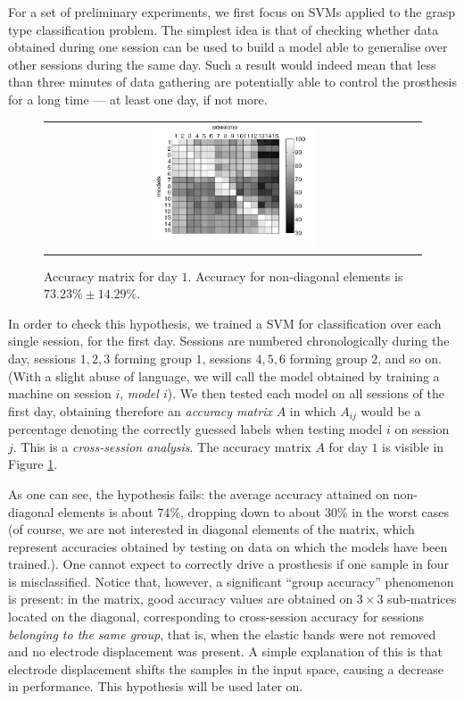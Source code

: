 For a set of preliminary experiments, we first focus on SVMs applied
to the grasp type classification problem. The simplest idea is that of
checking whether data obtained during one session can be used to build
a model able to generalise over other sessions during the same
day. Such a result would indeed mean that less than three minutes of
data gathering are potentially able to control the prosthesis for a
long time --- at least one day, if not more.

\begin{figure}[!ht] \centering
  \begin{tabular}{c}
    \includegraphics[width=0.45\textwidth]{figs/fig_resCross1_full.png}
  \end{tabular}
  \caption{Accuracy matrix for day $1$. Accuracy for non-diagonal
    elements is $73.23\% \pm 14.29\%$.}
  \label{fig:cross_first}
\end{figure}

In order to check this hypothesis, we trained a SVM for classification
over each single session, for the first day. Sessions are numbered
chronologically during the day, sessions $1,2,3$ forming group $1$,
sessions $4,5,6$ forming group $2$, and so on. (With a slight abuse of
language, we will call the model obtained by training a machine on
session $i$, \emph{model $i$}). We then tested each model on all
sessions of the first day, obtaining therefore an \emph{accuracy
matrix} $A$ in which $A_{ij}$ would be a percentage denoting the
correctly guessed labels when testing model $i$ on session $j$. This
is a \emph{cross-session analysis}. The accuracy matrix $A$ for day
$1$ is visible in Figure \ref{fig:cross_first}.

As one can see, the hypothesis fails: the average accuracy attained on
non-diagonal elements is about $74\%$, dropping down to about $30\%$
in the worst cases (of course, we are not interested in diagonal
elements of the matrix, which represent accuracies obtained by testing
on data on which the models have been trained.). One cannot expect to
correctly drive a prosthesis if one sample in four is
misclassified. Notice that, however, a significant ``group accuracy''
phenomenon is present: in the matrix, good accuracy values are
obtained on $3\times3$ sub-matrices located on the diagonal,
corresponding to cross-session accuracy for sessions \emph{belonging
to the same group}, that is, when the elastic bands were not removed
and no electrode displacement was present. A simple explanation of
this is that electrode displacement shifts the samples in the input
space, causing a decrease in performance. This hypothesis will be used
later on.

